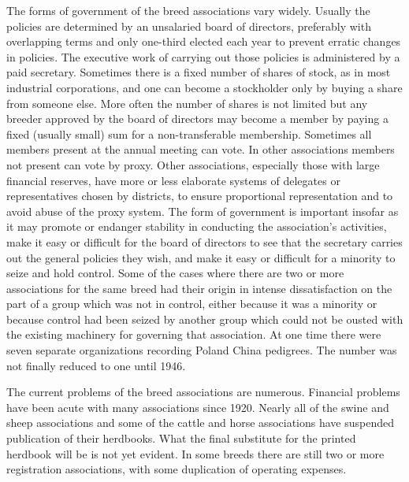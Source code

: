 The forms of government of the breed associations vary widely. Usually the policies are determined by an unsalaried board 
of directors, preferably with overlapping terms and only one-third elected each year to prevent erratic changes in 
policies. The executive work of carrying out those policies is administered by a paid secretary. Sometimes there is a fixed 
number of shares of stock, as in most industrial corporations, and one can become a stockholder only by buying a share from 
someone else. More often the number of shares is not limited but any breeder approved by the board of directors may become 
a member by paying a fixed (usually small) sum for a non-transferable membership. Sometimes all members present at the 
annual meeting can vote. In other associations members not present can vote by proxy. Other associations, especially those 
with large financial reserves, have more or less elaborate systems of delegates or representatives chosen by districts, to 
ensure proportional representation and to avoid abuse of the proxy system. The form of government is important insofar as 
it may promote or endanger stability in conducting the association's activities, make it easy or difficult for the board of 
directors to see that the secretary carries out the general policies they wish, and make it easy or difficult for a minority
to seize and hold control. Some of the cases where there are two or more associations for the same breed had their origin 
in intense dissatisfaction on the part of a group which was not in control, either because it was a minority or because 
control had been seized by another group which could not be ousted with the existing machinery for governing that 
association. At one time there were seven separate organizations recording Poland China pedigrees. The number was not finally
reduced to one until 1946.

The current problems of the breed associations are numerous. Financial problems have been acute with many associations 
since 1920. Nearly all of the swine and sheep associations and some of the cattle and horse associations have suspended 
publication of their herdbooks. What the final substitute for the printed herdbook will be is not yet evident. In some 
breeds there are still two or more registration associations, with some duplication of operating expenses.

